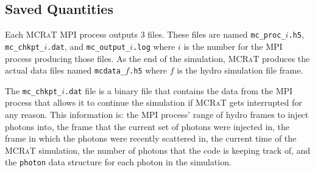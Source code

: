 \documentclass[12pt,a4paper]{article}
\newcommand{\mcrat}{\textsc{MCRaT}}
\begin{document}
\subsection{Saved Quantities} 

Each \mcrat{} MPI process outputs 3 files. These files are named \texttt{mc\_proc\_$i$.h5}, \texttt{mc\_chkpt\_$i$.dat}, and \texttt{mc\_output\_$i$.log} where $i$ is the number for the MPI process producing those files. As the end of the simulation, \mcrat{} produces the actual data files named \texttt{mcdata\_$f$.h5} where $f$ is the hydro simulation file frame.

The \texttt{mc\_chkpt\_$i$.dat} file is a binary file that contains the data from the MPI process that allows it to continue the simulation if \mcrat{} gets interrupted for any reason. This information is: the MPI process' range of hydro frames to inject photons into, the frame that the current set of photons were injected in, the frame in which the photons were recently scattered in, the current time of the \mcrat{} simulation, the number of photons that the code is keeping track of, and the \texttt{photon} data structure for each photon in the simulation.
\end{document}
